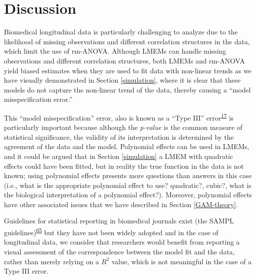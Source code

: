 \documentclass[
]{article}
\begin{document}
\hypertarget{discussion}{%
\section{Discussion}\label{discussion}}

Biomedical longitudinal data is particularly challenging to analyze due to the likelihood of missing observations and different correlation structures in the data, which limit the use of rm-ANOVA. Although LMEMs can handle missing observations and different correlation structures, both LMEMs and rm-ANOVA yield biased estimates when they are used to fit data with non-linear trends as we have visually demonstrated in Section \ref{simulation}, where it is clear that these models do not capture the non-linear trend of the data, thereby causing a ``model misspecification error.''

This ``model misspecification'' error, also is known as a ``Type III'' error\textsuperscript{\protect\hyperlink{ref-dennis2019}{17}} is particularly important because although the \emph{p-value} is the common measure of statistical significance, the validity of its interpretation is determined by the agreement of the data and the model. Polynomial effects can be used in LMEMs, and it could be argued that in Section \ref{simulation} a LMEM with quadratic effects could have been fitted, but in reality the true function in the data is not known; using polynomial effects presents more questions than answers in this case (i.e., what is the appropriate polynomial effect to use? quadratic?, cubic?, what is the biological interpretation of a polynomial effect?). Moreover, polynomial effects have other associated issues that we have described in Section \ref{GAM-theory}.

Guidelines for statistical reporting in biomedical journals exist (the SAMPL guidelines)\textsuperscript{\protect\hyperlink{ref-lang2015}{65}} but they have not been widely adopted and in the case of longitudinal data, we consider that researchers would benefit from reporting a visual assessment of the correspondence between the model fit and the data, rather than merely relying on a \(R^2\) value, which is not meaningful in the case of a Type III error.
\end{document}
